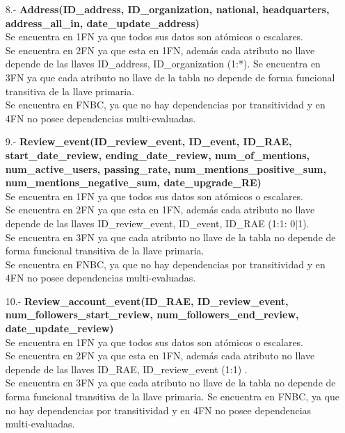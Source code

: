 \documentclass{memoria}
\begin{document}
\begin{itemize}
\item[8.-]\textbf{Address(ID\_address, ID\_organization, national, headquarters, address\_all\_in, date\_update\_address)}
\\
Se encuentra en 1FN ya que todos sus datos son atómicos o escalares.\\
Se encuentra en 2FN ya que esta en 1FN, además cada atributo no llave depende de las llaves ID\_address, ID\_organization (1:*). Se encuentra en 3FN ya que cada atributo no llave de la tabla no depende de forma funcional transitiva de la llave primaria. 
\\Se encuentra en FNBC,  ya que no hay dependencias por transitividad y en  4FN no posee dependencias multi-evaluadas.

\item[9.-]\textbf{Review\_event(ID\_review\_event, ID\_event, ID\_RAE, start\_date\_review, ending\_date\_review, num\_of\_mentions, num\_active\_users, passing\_rate, num\_mentions\_positive\_sum, num\_mentions\_negative\_sum, date\_upgrade\_RE)}
\\
Se encuentra en 1FN ya que todos sus datos son atómicos o escalares.\\
Se encuentra en 2FN ya que esta en 1FN, además cada atributo no llave depende de las llaves ID\_review\_event, ID\_event, ID\_RAE (1:1: 0$|$1).\\
Se encuentra en 3FN ya que cada atributo no llave de la tabla no depende de forma funcional transitiva de la llave primaria. \\
Se encuentra en FNBC,  ya que no hay dependencias por transitividad y en 4FN no posee dependencias multi-evaluadas.

\item[10.-]\textbf{Review\_account\_event(ID\_RAE, ID\_review\_event, num\_followers\_start\_review, num\_followers\_end\_review, date\_update\_review)}
\\
Se encuentra en 1FN ya que todos sus datos son atómicos o escalares.\\
Se encuentra en 2FN ya que esta en 1FN, además cada atributo no llave depende de las llaves ID\_RAE, ID\_review\_event  (1:1) .\\
Se encuentra en 3FN ya que cada atributo no llave de la tabla no depende de forma funcional transitiva de la llave primaria. Se encuentra en FNBC,  ya que no hay dependencias por transitividad y en  4FN no posee dependencias multi-evaluadas.


\end{itemize}
\end{document}
